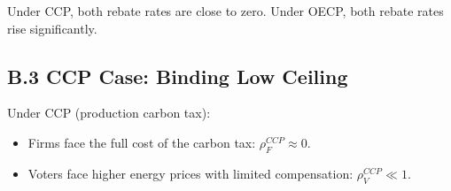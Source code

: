 \documentclass[12pt]{article}
\begin{document}
Under CCP, both rebate rates are close to zero. Under OECP, both rebate rates rise significantly.


\subsection*{B.3 CCP Case: Binding Low Ceiling}


Under CCP (production carbon tax):
\begin{itemize}
\item Firms face the full cost of the carbon tax: $\rho_F^{CCP} \approx 0$.
\item Voters face higher energy prices with limited compensation: $\rho_V^{CCP} \ll 1$.
\end{itemize}
\end{document}
